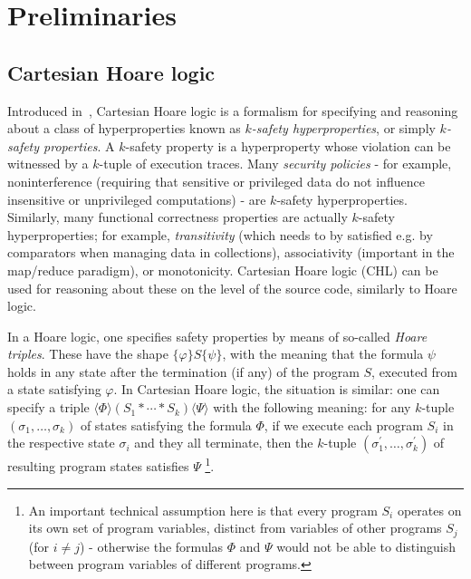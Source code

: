 \section{Preliminaries}


\subsection{Cartesian Hoare logic}

Introduced in~\cite{SousaD16}, Cartesian Hoare logic is a formalism for specifying and reasoning about
a class of hyperproperties known as \emph{$k$-safety hyperproperties}, or simply
\emph{$k$-safety properties}.
A $k$-safety property is a hyperproperty whose violation can be witnessed by a $k$-tuple of execution traces.
Many \emph{security policies} - for example, noninterference (requiring that sensitive or privileged data
do not influence insensitive or unprivileged computations) - are $k$-safety hyperproperties.
Similarly, many functional correctness properties are actually $k$-safety hyperproperties;
for example, \emph{transitivity} (which needs to by satisfied e.g. by comparators when managing data
in collections), associativity (important in the map/reduce paradigm), or monotonicity.
Cartesian Hoare logic (CHL) can be used for reasoning about these on the level of the source code,
similarly to Hoare logic.

In a Hoare logic, one specifies safety properties by means of so-called \emph{Hoare triples}.
These have the shape $\{ \varphi \} S \{ \psi \}$, with the meaning that
the formula $\psi$ holds in any state after the termination (if any) of the program $S$,
executed from a state satisfying $\varphi$.
In Cartesian Hoare logic, the situation is similar: one can specify a triple
$\langle \Phi \rangle (S_1 * \cdots * S_k) \langle \Psi \rangle$
with the following meaning: for any $k$-tuple $(\sigma_1,\ldots,\sigma_k)$ of states
satisfying the formula $\Phi$, if we execute each program $S_i$ in the respective state $\sigma_i$ and they all terminate,
then the $k$-tuple $(\sigma_1^\prime,\ldots,\sigma_k^\prime)$ of resulting program states satisfies $\Psi$ \footnote{An
important technical assumption here is that every program $S_i$ operates on its own set of program variables,
distinct from variables of other programs $S_j$ (for $i \not = j$) - otherwise the formulas $\Phi$ and $\Psi$
would not be able to distinguish between program variables of different programs.}.

